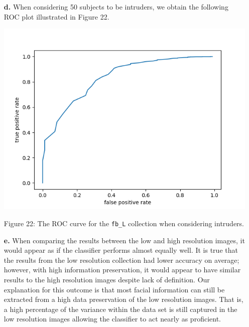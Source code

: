 \documentclass[ 12pt ]{article}
\begin{document}
\begin{enumerate}
\begin{enumerate}
        \end{enumerate}

    \item[\textbf{d.}] When considering 50 subjects to be intruders, we obtain the following ROC plot illustrated in Figure 22.
        \begin{center}
            \includegraphics[scale=0.6]{roc_L}
        \end{center}
        \begin{center}
            \scriptsize
            Figure 22: The ROC curve for the \verb|fb_L| collection when considering intruders.
        \end{center}

    \item[\textbf{e.}] When comparing the results between the low and high resolution images, it would appear as if the classifier performs almost equally well. It is true that the
        results from the low resolution collection had lower accuracy on average; however, with high information preservation, it would appear to have similar results to the
        high resolution images despite lack of definition. Our explanation for this outcome is that most facial information can still be extracted from a high data preservation of the
        low resolution images. That is, a high percentage of the variance within the data set is still captured in the low resolution images allowing the classifier to act nearly as
        proficient.


\end{enumerate}
\end{document}
